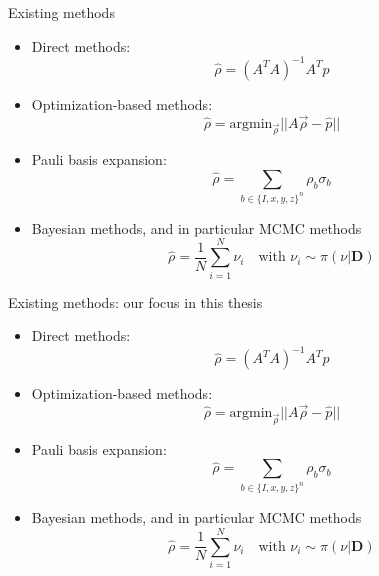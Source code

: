 \documentclass{beamer}
\newcommand{\mb}{\mathbf}
\newcommand{\semitransp}[2][35]{\textcolor{fg!#1}{#2}}
\begin{document}
\begin{frame}{Existing methods}
    \begin{itemize}
        \item Direct methods: \begin{equation}
            \hat \rho = (A^TA)^{-1}A^T \hat p
        \end{equation}
        \item Optimization-based methods: \begin{equation}
            \hat \rho = \text{argmin}_{\vec\rho} ||A \vec\rho - \hat p||
        \end{equation} 
        \item Pauli basis expansion:\begin{equation}
            \hat \rho = \sum_{b\in\{I,x,y,z\}^n} \rho_b \sigma_b
        \end{equation}
        \item Bayesian methods, and in particular MCMC methods
        \begin{equation}
        \hat \rho = \frac{1}{N}\sum_{i=1}^N \nu_i \quad \text{with } \nu_i \sim \pi(\nu|\mb D)
        \end{equation}
    \end{itemize}
\end{frame}
\begin{frame}{Existing methods: our focus in this thesis}
    \begin{itemize}
        \item<0> Direct methods: \begin{equation}
            \hat \rho = (A^TA)^{-1}A^T \hat p
        \end{equation}
        \item<0> Optimization-based methods: \begin{equation}
            \hat \rho = \text{argmin}_{\vec\rho} ||A \vec\rho - \hat p||
        \end{equation} 
        \item<0> Pauli basis expansion:
        \begin{equation}
            \hat \rho = \sum_{b\in\{I,x,y,z\}^n} \rho_b \sigma_b
        \end{equation}
        \item<1> Bayesian methods, and in particular MCMC methods
        \begin{equation}
        \hat \rho = \frac{1}{N}\sum_{i=1}^N \nu_i \quad \text{with } \nu_i \sim \pi(\nu|\mb D)
        \end{equation}
    \end{itemize}
\end{frame}
\end{document}
